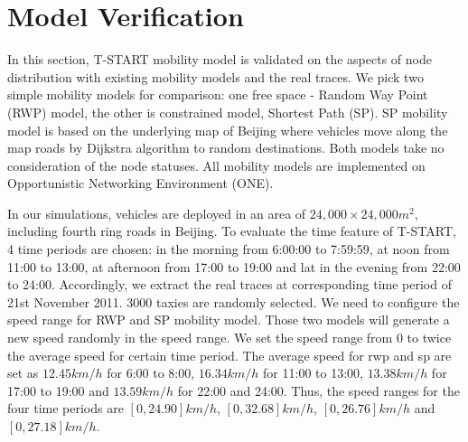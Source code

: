 \section{Model Verification}
\label{section_model_varification}

In this section, T-START mobility model is validated on the aspects of node distribution with existing mobility models and the real traces. We pick two simple mobility models for comparison: one free space - Random Way Point (RWP) model, the other is constrained model, Shortest Path (SP).  SP mobility model is based on the underlying map of Beijing where vehicles move along the map roads by Dijkstra algorithm to random destinations. Both models take no consideration of the node statuses. All mobility models are implemented on Opportunistic Networking Environment (ONE)\cite{KeranenOtt-155}.

In our simulations, vehicles are deployed in an area of $24,000\times 24,000 m^2$, including fourth ring roads in Beijing.
To evaluate the time feature of T-START, 4 time periods are chosen: in the morning from 6:00:00 to 7:59:59, at noon from 11:00 to 13:00, at afternoon from 17:00 to 19:00 and lat in the evening from 22:00 to 24:00. Accordingly, we extract the real traces at corresponding time period of 21st November 2011.
3000 taxies are randomly selected. 
We need to configure the speed range for RWP and SP mobility model. Those two models will generate a new speed randomly in the speed range. We set the speed range from 0 to twice the average speed for certain time period.
The average speed for rwp and sp are set as $12.45 km/h$ for 6:00 to 8:00, $16.34km/h$ for 11:00 to 13:00, $13.38km/h$ for 17:00 to 19:00 and $13.59 km/h$ for 22:00 and 24:00. 
Thus, the speed ranges for the four time periods are $[0, 24.90]km/h$, $[0, 32.68]km/h$, $[0, 26.76]km/h$ and $[0, 27.18]km/h$.

